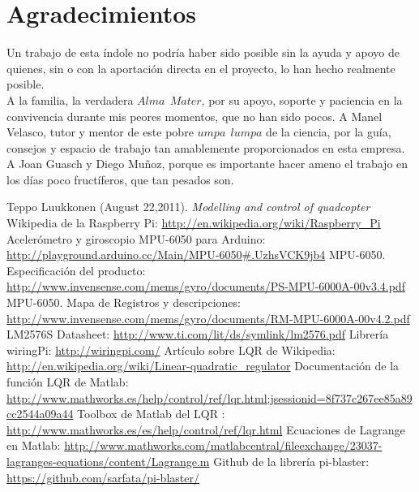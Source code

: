 \documentclass[twoside,11pt]{book}
\begin{document}
\newpage

\chapter*{Agradecimientos}

Un trabajo de esta índole no podría haber sido posible sin la ayuda y apoyo de quienes, sin o con la aportación directa en el proyecto, lo han hecho realmente posible. \\

A la familia, la verdadera $Alma\>\>Mater$, por su apoyo,  soporte y paciencia en la convivencia durante mis peores momentos, que no han sido pocos. A Manel Velasco, tutor y mentor de este pobre $umpa\>\>lumpa$ de la ciencia, por la guía, consejos y espacio de trabajo tan amablemente proporcionados en esta empresa. A Joan Guasch y Diego Muñoz, porque es importante hacer ameno el trabajo en los días poco fructíferos, que tan pesados son. 

\newpage

\begin{thebibliography}{99}
 Teppo Luukkonen (August 22,2011). \textit{Modelling and control of quadcopter}
 Wikipedia de la Raspberry Pi: \url{http://en.wikipedia.org/wiki/Raspberry_Pi}
 Acelerómetro y giroscopio MPU-6050 para Arduino: \url{http://playground.arduino.cc/Main/MPU-6050#.UzhsVCK9jb4}
 MPU-6050. Especificación del producto: \url{http://www.invensense.com/mems/gyro/documents/PS-MPU-6000A-00v3.4.pdf}
 MPU-6050. Mapa de Registros y descripciones: \url{http://www.invensense.com/mems/gyro/documents/RM-MPU-6000A-00v4.2.pdf}
 LM2576S Datasheet: \url{http://www.ti.com/lit/ds/symlink/lm2576.pdf}
 Librería wiringPi: \url{http://wiringpi.com/}
 Artículo sobre LQR de Wikipedia: \url{http://en.wikipedia.org/wiki/Linear-quadratic_regulator}
 Documentación de la función LQR de Matlab: \url{http://www.mathworks.es/help/control/ref/lqr.html;jsessionid=8f737c267ee85a89cc2544a09a44}
 Toolbox de Matlab del LQR : \url{http://www.mathworks.es/es/help/control/ref/lqr.html}
 Ecuaciones de Lagrange en Matlab: \url{http://www.mathworks.com/matlabcentral/fileexchange/23037-lagranges-equations/content/Lagrange.m}
 Github de la librería pi-blaster: \url{https://github.com/sarfata/pi-blaster/}
\end{thebibliography}{}
\end{document}

